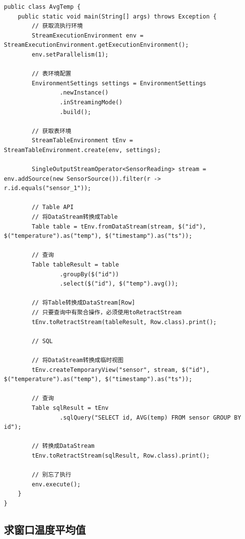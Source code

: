 \documentclass[cn,11pt,chinese]{elegantbook}
\begin{document}
\begin{verbatim}
public class AvgTemp {
    public static void main(String[] args) throws Exception {
        // 获取流执行环境
        StreamExecutionEnvironment env = StreamExecutionEnvironment.getExecutionEnvironment();
        env.setParallelism(1);

        // 表环境配置
        EnvironmentSettings settings = EnvironmentSettings
                .newInstance()
                .inStreamingMode()
                .build();

        // 获取表环境
        StreamTableEnvironment tEnv = StreamTableEnvironment.create(env, settings);

        SingleOutputStreamOperator<SensorReading> stream = env.addSource(new SensorSource()).filter(r -> r.id.equals("sensor_1"));

        // Table API
        // 将DataStream转换成Table
        Table table = tEnv.fromDataStream(stream, $("id"), $("temperature").as("temp"), $("timestamp").as("ts"));

        // 查询
        Table tableResult = table
                .groupBy($("id"))
                .select($("id"), $("temp").avg());

        // 将Table转换成DataStream[Row]
        // 只要查询中有聚合操作，必须使用toRetractStream
        tEnv.toRetractStream(tableResult, Row.class).print();

        // SQL

        // 将DataStream转换成临时视图
        tEnv.createTemporaryView("sensor", stream, $("id"), $("temperature").as("temp"), $("timestamp").as("ts"));

        // 查询
        Table sqlResult = tEnv
                .sqlQuery("SELECT id, AVG(temp) FROM sensor GROUP BY id");

        // 转换成DataStream
        tEnv.toRetractStream(sqlResult, Row.class).print();

        // 别忘了执行
        env.execute();
    }
}
\end{verbatim}

\subsection{求窗口温度平均值}
\end{document}
